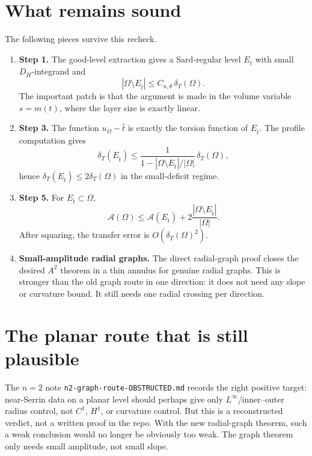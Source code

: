 \documentclass[11pt]{article}
\newcommand{\Om}{\Omega}
\newcommand{\cA}{\mathcal A}
\begin{document}
\section{What remains sound}

The following pieces survive this recheck.

\begin{enumerate}
\item \textbf{Step 1.}  The good-level extraction gives a Sard-regular
level \(E_{\hat t}\) with small \(D_H\)-integrand and
\[
   |\Om\setminus E_{\hat t}|\le C_{n,\theta}\,\delta_T(\Om).
\]
The important patch is that the argument is made in the volume variable
\(s=m(t)\), where the layer size is exactly linear.

\item \textbf{Step 3.}  The function \(u_\Om-\hat t\) is exactly the torsion
function of \(E_{\hat t}\).  The profile computation gives
\[
   \delta_T(E_{\hat t})\le
   \frac{1}{1-|\Om\setminus E_{\hat t}|/|\Om|}\,\delta_T(\Om),
\]
hence \(\delta_T(E_{\hat t})\le 2\delta_T(\Om)\) in the small-deficit
regime.

\item \textbf{Step 5.}  For \(E_{\hat t}\subset \Om\),
\[
   \cA(\Om)\le \cA(E_{\hat t})+
       2\frac{|\Om\setminus E_{\hat t}|}{|\Om|}.
\]
After squaring, the transfer error is \(O(\delta_T(\Om)^2)\).

\item \textbf{Small-amplitude radial graphs.}  The direct radial-graph proof
closes the desired \(A^2\) theorem in a thin annulus for genuine radial
graphs.  This is stronger than the old graph route in one direction: it
does not need any slope or curvature bound.  It still needs one radial
crossing per direction.
\end{enumerate}

\section{The planar route that is still plausible}

The \(n=2\) note \texttt{n2-graph-route-OBSTRUCTED.md} records the right
positive target: near-Serrin data on a planar level should perhaps give only
\(L^\infty\)/inner--outer radius control, not \(C^1\), \(H^1\), or curvature
control.  But this is a reconstructed verdict, not a written proof in the
repo.  With the new radial-graph theorem, such a weak conclusion would no
longer be obviously too weak.  The graph theorem only needs small amplitude,
not small slope.
\end{document}
